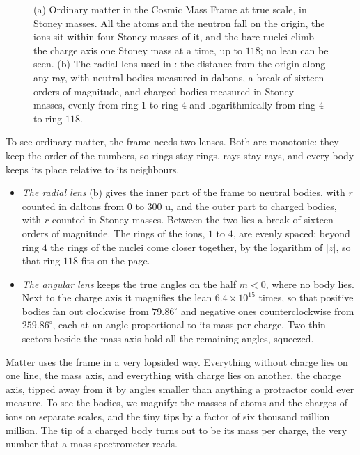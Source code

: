 \begin{figure}[tb]
\myfloatalign

\caption[Ordinary matter at true scale, and the radial lens]{(a) Ordinary matter in the Cosmic Mass Frame at true scale, in Stoney masses. All the atoms and the neutron fall on the origin, the ions sit within four Stoney masses of it, and the bare nuclei climb the charge axis one Stoney mass at a time, up to $118$; no lean can be seen. (b) The radial lens used in : the distance from the origin along any ray, with neutral bodies measured in daltons, a break of sixteen orders of magnitude, and charged bodies measured in Stoney masses, evenly from ring $1$ to ring $4$ and logarithmically from ring $4$ to ring $118$.}
\label{fig:sm-truescale}
\end{figure}

To see ordinary matter, the frame needs two lenses. Both are monotonic: they keep the order of the numbers, so rings stay rings, rays stay rays, and every body keeps its place relative to its neighbours.
\begin{itemize}
  \item \emph{The radial lens} (b) gives the inner part of the frame to neutral bodies, with $r$ counted in daltons from $0$ to $300$ u, and the outer part to charged bodies, with $r$ counted in Stoney masses. Between the two lies a break of sixteen orders of magnitude. The rings of the ions, $1$ to $4$, are evenly spaced; beyond ring $4$ the rings of the nuclei come closer together, by the logarithm of $|z|$, so that ring $118$ fits on the page.
  \item \emph{The angular lens} keeps the true angles on the half $m < 0$, where no body lies. Next to the charge axis it magnifies the lean $6.4 \times 10^{15}$ times, so that positive bodies fan out clockwise from $79.86^\circ$ and negative ones counterclockwise from $259.86^\circ$, each at an angle proportional to its mass per charge. Two thin sectors beside the mass axis hold all the remaining angles, squeezed.
\end{itemize}

\begin{plainwords}
Matter uses the frame in a very lopsided way. Everything without charge lies on one line, the mass axis, and everything with charge lies on another, the charge axis, tipped away from it by angles smaller than anything a protractor could ever measure. To see the bodies, we magnify: the masses of atoms and the charges of ions on separate scales, and the tiny tips by a factor of six thousand million million. The tip of a charged body turns out to be its mass per charge, the very number that a mass spectrometer reads.
\end{plainwords}

